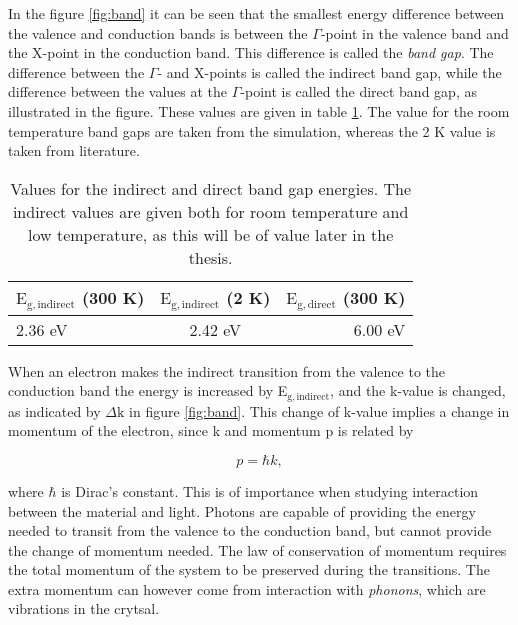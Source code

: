 In the figure \ref{fig:band} it can be seen that the smallest energy difference between the valence and conduction bands is between the $\Gamma$-point in the valence band and the X-point in the conduction band. This difference is called the \emph{band gap}. The difference between the $\Gamma$- and X-points is called the indirect band gap, while the difference between the values at the $\Gamma$-point is called the direct band gap, as illustrated in the figure. These values are given in table \ref{tab:eg}. The value for the room temperature band gaps are taken from the simulation, whereas the 2 K value is taken from literature. 

\begin{table}[h]
\caption{Values for the indirect and direct band gap energies. The indirect values are given both for room temperature and low temperature, as this will be of value later in the thesis.}
\label{tab:eg}
\begin{center}
\begin{tabular}{ l c r }
  \hline                       
  \hline       
  \vspace{1mm}
    $\mathrm{E_{g,indirect}}$  (300 K) & $\mathrm{E_{g,indirect}}$ (2 K) & $\mathrm{E_{g,direct}}$  (300 K)\\
    \hline
  2.36 eV & 2.42 eV \cite{Bimberg1981} & 6.00 eV\\
  \hline  
\end{tabular}
\end{center}
\end{table}

When an electron makes the indirect transition from the valence to the conduction band the energy is increased by E$_\mathrm{g,indirect}$, and the k-value is changed, as indicated by $\Delta \mathrm{k}$ in figure \ref{fig:band}. This change of k-value implies a change in momentum of the electron, since k and momentum p is related by

\[p = \hbar k,\]

\noindent where $\hbar$ is Dirac's constant. This is of importance when studying interaction between the material and light. Photons are capable of providing the energy needed to transit from the valence to the conduction band, but cannot provide the change of momentum needed. The law of conservation of momentum requires the total momentum of the system to be preserved during the transitions. The extra momentum can however come from interaction with \emph{phonons}, which are vibrations in the crytsal. 

